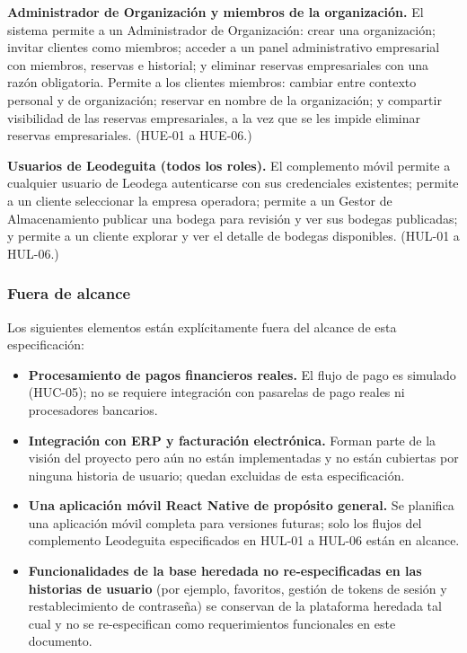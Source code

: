 \textbf{Administrador de Organización y miembros de la organización.} El sistema permite a un Administrador de Organización: crear una organización; invitar clientes como miembros; acceder a un panel administrativo empresarial con miembros, reservas e historial; y eliminar reservas empresariales con una razón obligatoria. Permite a los clientes miembros: cambiar entre contexto personal y de organización; reservar en nombre de la organización; y compartir visibilidad de las reservas empresariales, a la vez que se les impide eliminar reservas empresariales. (HUE-01 a HUE-06.)

\textbf{Usuarios de Leodeguita (todos los roles).} El complemento móvil permite a cualquier usuario de Leodega autenticarse con sus credenciales existentes; permite a un cliente seleccionar la empresa operadora; permite a un Gestor de Almacenamiento publicar una bodega para revisión y ver sus bodegas publicadas; y permite a un cliente explorar y ver el detalle de bodegas disponibles. (HUL-01 a HUL-06.)

\subsubsection*{Fuera de alcance}

Los siguientes elementos están explícitamente fuera del alcance de esta especificación:

\begin{itemize}
    \item \textbf{Procesamiento de pagos financieros reales.} El flujo de pago es simulado (HUC-05); no se requiere integración con pasarelas de pago reales ni procesadores bancarios.
    \item \textbf{Integración con ERP y facturación electrónica.} Forman parte de la visión del proyecto pero aún no están implementadas y no están cubiertas por ninguna historia de usuario; quedan excluidas de esta especificación.
    \item \textbf{Una aplicación móvil React Native de propósito general.} Se planifica una aplicación móvil completa para versiones futuras; solo los flujos del complemento Leodeguita especificados en HUL-01 a HUL-06 están en alcance.
    \item \textbf{Funcionalidades de la base heredada no re-especificadas en las historias de usuario} (por ejemplo, favoritos, gestión de tokens de sesión y restablecimiento de contraseña) se conservan de la plataforma heredada tal cual y no se re-especifican como requerimientos funcionales en este documento.
\end{itemize}

